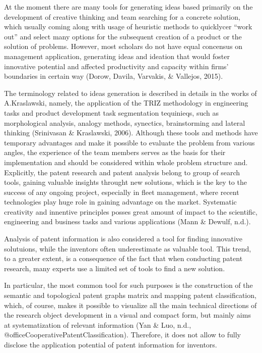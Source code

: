 \documentclass[12pt,twoside]{reedthesis}
\begin{document}
At the moment there are many tools for generating ideas based primarily on the development of creative thinking and team searching for a concrete solution, which usually coming along with usage of heuristic methods to quicklycer ``work out'' and select many options for the subsequent creation of a product or the solution of problems. However, most scholars do not have equal concensus on management application, generating ideas and ideation that would foster innovative potential and affected productivity and capacity within firms' boundaries in certain way (Dorow, Davila, Varvakis, \& Vallejos, 2015).

The terminology related to ideas generation is described in details in the works of A.Kraslawski, namely, the application of the TRIZ methodology in engineering tasks and product development task segmentation tequinieqs, such as morphological analysis, analogy methods, synectics, brainstorming and lateral thinking (Srinivasan \& Kraslawski, 2006). Although these tools and methods have temporary advantages and make it possible to evaluate the problem from various angles, the experience of the team members serves as the basis for their implementation and should be considered within whole problem structure and. Explicitly, the patent research and patent analysis belong to group of search tools, gaining valuable insights throught new solutions, which is the key to the success of any ongoing project, especially in fleet management, where recent technologies play huge role in gaining advantage on the market. Systematic creativity and innentive principles posses great amount of impact to the scientific, engineering and business tasks and various applications (Mann \& Dewulf, n.d.).

Analysis of patent information is also considered a tool for finding innovative solutuions, while the inventors often underestimate as valuable tool. This trend, to a greater extent, is a consequence of the fact that when conducting patent research, many experts use a limited set of tools to find a new solution.

In particular, the most common tool for such purposes is the construction of the semantic and topological patent graphs matrix and mapping patent classification, which, of course, makes it possible to visualize all the main technical directions of the research object development in a visual and compact form, but mainly aims at systematization of relevant information (Yan \& Luo, n.d., @officeCooperativePatentClassification). Therefore, it does not allow to fully disclose the application potential of patent information for inventors.
\end{document}

